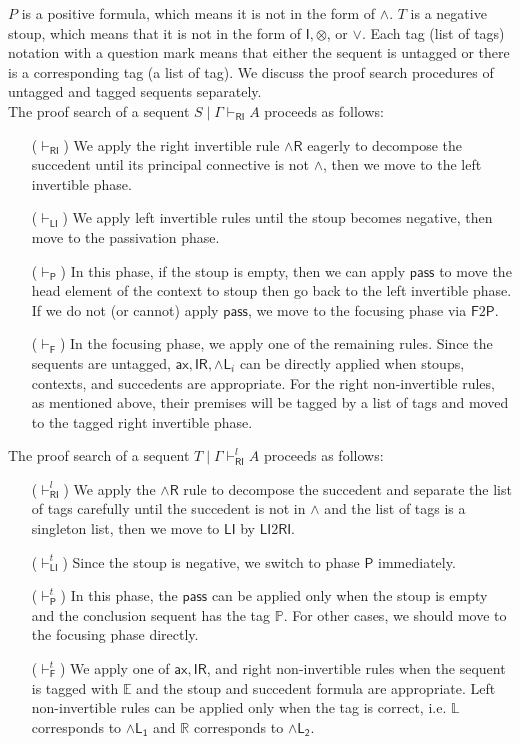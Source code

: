 \documentclass[submission,copyright,creativecommons]{eptcs}
\theoremstyle{definition}
\newcommand{\pass}{\mathsf{pass}}
\newcommand{\unitr}{\mathsf{IR}}
\newcommand{\andlone}{\land \mathsf{L_{1}}}
\newcommand{\andltwo}{\land \mathsf{L_{2}}}
\newcommand{\andli}{\land \mathsf{L}_{i}}
\newcommand{\andr}{\land \mathsf{R}}
\newcommand{\ax}{\mathsf{ax}}
\newcommand{\ot}{\otimes}
\newcommand{\I}{\mathsf{I}}
\newcommand{\RI}{\mathsf{RI}}
\newcommand{\LI}{\mathsf{LI}}
\newcommand{\Pass}{\mathsf{P}}
\newcommand{\F}{\mathsf{F}}
\newcommand{\tP}{\mathbb{P}}
\newcommand{\tL}{\mathbb{L}}
\newcommand{\tR}{\mathbb{R}}
\newcommand{\tE}{\mathbb{E}}
\begin{document}
$P$ is a positive formula, which means it is not in the form of $\land$.
$T$ is a negative stoup, which means that it is not in the form of $\I , \ot$, or $\lor$.
Each tag (list of tags) notation with a question mark means that either the sequent is untagged or there is a corresponding tag (a list of tag).
We discuss the proof search procedures of untagged and tagged sequents separately.
\\
The proof search of a sequent $S \mid \Gamma \vdash_\RI A$ proceeds as follows:
\begin{itemize}
  \item[($\vdash_{\RI}$)] We apply the right invertible rule $\andr$ eagerly to decompose the succedent until its principal connective is not $\land$, then we move to the left invertible phase.
  \item[($\vdash_{\LI}$)] We apply left invertible rules until the stoup becomes negative, then move to the passivation phase.
  \item[($\vdash_{\Pass}$)] In this phase, if the stoup is empty, then we can apply $\pass$ to move the head element of the context to stoup then go back to the left invertible phase.  If we do not (or cannot) apply $\pass$, we move to the focusing phase via $\F2 \Pass$.
  \item[($\vdash_{\F}$)] In the focusing phase, we apply one of the remaining rules. Since the sequents are untagged, $\ax , \unitr , \andli$ can be directly applied when stoups, contexts, and succedents are appropriate.
  For the right non-invertible rules, as mentioned above, their premises will be tagged by a list of tags and moved to the tagged right invertible phase.
\end{itemize}
The proof search of a sequent $T \mid \Gamma \vdash^{l}_\RI A$ proceeds as follows:
\begin{itemize}
  \item[($\vdash^{l}_{\RI}$)] We apply the $\andr$ rule to decompose the succedent and separate the list of tags carefully until the succedent is not in $\land$ and the list of tags is a singleton list, then we move to $\LI$ by $\LI2 \RI$.
  \item[($\vdash^{t}_{\LI}$)] Since the stoup is negative, we switch to phase $\Pass$ immediately.
  \item[($\vdash^{t}_{\Pass}$)] In this phase, the $\pass$ can be applied only when the stoup is empty and the conclusion sequent has the tag $\tP$. For other cases, we should move to the focusing phase directly.
  \item[($\vdash^{t}_{\F}$)] We apply one of $\ax , \unitr$, and right non-invertible rules when the sequent is tagged with $\tE$ and the stoup and succedent formula are appropriate. 
  Left non-invertible rules can be applied only when the tag is correct, i.e. $\tL$ corresponds to $\andlone$ and $\tR$ corresponds to $\andltwo$.
\end{itemize}
\end{document}

